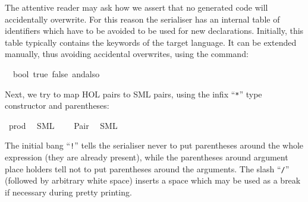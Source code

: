 \begin{isabellebody}
\isamarkuptrue%
%
\endisatagquote
{\isafoldquote}%
%
\isadelimquote
%
\endisadelimquote
%
\begin{isamarkuptext}%
\noindent The attentive reader may ask how we assert that no
  generated code will accidentally overwrite.  For this reason the
  serialiser has an internal table of identifiers which have to be
  avoided to be used for new declarations.  Initially, this table
  typically contains the keywords of the target language.  It can be
  extended manually, thus avoiding accidental overwrites, using the
  \hypertarget{command.code-reserved}{\hyperlink{command.code-reserved}{\mbox{}}} command:%
\end{isamarkuptext}%
\isamarkuptrue%
%
\isadelimquote
%
\endisadelimquote
%
\isatagquote
{}\isamarkupfalse%
\ {\isachardoublequoteopen}{\isasymSML}{\isachardoublequoteclose}\ bool\ true\ false\ andalso%
\endisatagquote
{\isafoldquote}%
%
\isadelimquote
%
\endisadelimquote
%
\begin{isamarkuptext}%
\noindent Next, we try to map HOL pairs to SML pairs, using the
  infix ``\verb|*|'' type constructor and parentheses:%
\end{isamarkuptext}%
\isamarkuptrue%
%
\isadeliminvisible
%
\endisadeliminvisible
%
\isataginvisible
%
\endisataginvisible
{\isafoldinvisible}%
%
\isadeliminvisible
%
\endisadeliminvisible
%
\isadelimquotett
%
\endisadelimquotett
%
\isatagquotett
{}\isamarkupfalse%
\ prod\isanewline
\ \ {\isacharparenleft}SML\ \ {}\ {\isachardoublequoteopen}{\isacharasterisk}{\isachardoublequoteclose}{\isacharparenright}\isanewline
{}\isamarkupfalse%
\ Pair\isanewline
\ \ {\isacharparenleft}SML\ {\isachardoublequoteopen}{\isacharbang}{\isacharparenleft}{\isacharparenleft}{\isacharunderscore}{\isacharparenright}{\isacharcomma}{\isacharslash}\ {\isacharparenleft}{\isacharunderscore}{\isacharparenright}{\isacharparenright}{\isachardoublequoteclose}{\isacharparenright}%
\endisatagquotett
{\isafoldquotett}%
%
\isadelimquotett
%
\endisadelimquotett
%
\begin{isamarkuptext}%
\noindent The initial bang ``\verb|!|'' tells the serialiser
  never to put parentheses around the whole expression (they are
  already present), while the parentheses around argument place
  holders tell not to put parentheses around the arguments.  The slash
  ``\verb|/|'' (followed by arbitrary white space) inserts a
  space which may be used as a break if necessary during pretty
  printing.


\end{isamarkuptext}
\end{isabellebody}
